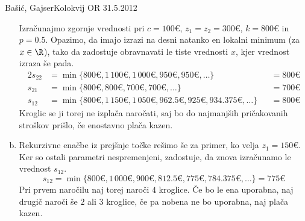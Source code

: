 \begin{naloga}{Bašić, Gajser}{Kolokvij OR 31.5.2012}
\begin{odgovor}
\begin{enumerate}[(a)]
Izračunajmo zgornje vrednosti
pri $c = 100 €$, $z_1 = z_2 = 300 €$, $k = 800 €$ in $p = 0.5$.
Opazimo, da imajo izrazi na desni natanko en lokalni minimum (za $x \in \R$),
tako da zadostuje obravnavati le tiste vrednosti $x$,
kjer vrednost izraza še pada.
\begin{alignat*}{2}
s_{22} &= \min\{800 €, 1\,100 €, 1\,000 €, 950 €, 950 €, \dots\} &&= 800 € \\
s_{21} &= \min\{800 €, 800 €, 700 €, 700 €, \dots\} &&= 700 € \\
s_{12} &= \min\{800 €, 1\,150 €, 1\,050 €, 962.5 €, 925 €, 934.375 €, \dots\}
&&= 800 €
\end{alignat*}
Kroglic se ji torej ne izplača naročati,
saj bo do najmanjših pričakovanih stroškov prišlo,
če enostavno plača kazen.

\item Rekurzivne enačbe iz prejšnje točke rešimo še za primer,
ko velja $z_1 = 150 €$.
Ker so ostali parametri nespremenjeni,
zadostuje, da znova izračunamo le vrednost $s_{12}$.
$$
s_{12} = \min\{800 €, 1\,000 €, 900 €, 812.5 €, 775 €, 784.375 €, \dots\}
= 775 €
$$
Pri prvem naročilu naj torej naroči $4$ kroglice.
Če bo le ena uporabna, naj drugič naroči še $2$ ali $3$ kroglice,
če pa nobena ne bo uporabna, naj plača kazen.
\end{enumerate}
\end{odgovor}
\end{naloga}
